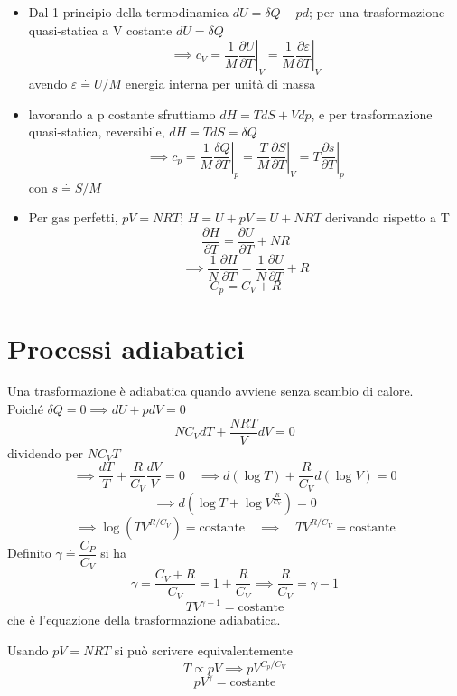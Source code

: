 \documentclass[a4paper,11pt]{report}
\newcommand{\defeq}{\overset{\cdot}{=}}
\begin{document}
		\begin{itemize}
			\item Dal 1 principio della termodinamica $dU = \delta Q - pd$; per una trasformazione quasi-statica a V costante $dU = \delta Q$
			$$
			\implies c_V =  \left.\dfrac{1}{M}\dfrac{\partial U}{\partial T}\right|_{V} =  \left.\dfrac{1}{M}\dfrac{\partial \varepsilon}{\partial T}\right|_{V}
			$$
			avendo $\varepsilon \defeq U/M$ energia interna per unità di massa
			
			\item lavorando a p costante sfruttiamo $dH = TdS  + Vdp$, e per trasformazione quasi-statica, reversibile, $dH = TdS = \delta Q$
			$$
			\implies c_p =  \left.\dfrac{1}{M}\dfrac{\delta Q }{\partial T}\right|_{p} =
			\left.\dfrac{T}{M}\dfrac{\partial S}{\partial T}\right|_{V} = 
			\left. T \dfrac{\partial s}{\partial T}\right|_{p}
			$$
			con $s\defeq S/M$
			
			\item Per gas perfetti, $pV = NRT$; $ H= U+pV = U + NRT$
			derivando rispetto a T
			$$
			\dfrac{\partial H}{\partial T} = \dfrac{\partial U}{\partial T} + NR
			$$
			$$
			\implies \dfrac{1}{N} \dfrac{\partial H}{\partial T} = \dfrac{1}{N}\dfrac{\partial U}{\partial T} + R
			$$
			$$
			C_p = C_V + R
			$$
		\end{itemize}		
	
	\section{Processi adiabatici}
		Una trasformazione è adiabatica quando avviene senza scambio di calore.\\
		Poiché $\delta Q =0 \implies dU + pdV =0$
		$$
		NC_VdT + \dfrac{NRT}{V}dV = 0
		$$
		dividendo per $NC_VT$
		$$
		\implies \dfrac{dT}{T} + \dfrac{R}{C_V} \dfrac{dV}{V}=0 \quad 
		\implies d\left(\log T\right) +  \dfrac{R}{C_V} d(\log V) = 0
		$$
		$$
		\implies d\left(\log T + \log V^{ \frac{R}{C_V}}\right) = 0
		$$
		$$
		\implies \log(TV^{R/C_V}) = \mathrm{costante} 
		\quad \implies \quad TV^{R/C_V} = \textrm{costante}
		$$
		Definito $\gamma \defeq \dfrac{C_P}{C_V}$ si ha
		$$
		\gamma = \dfrac{C_V + R}{C_V} = 1 + \dfrac{R}{C_V} \implies \dfrac{R}{C_V} = \gamma -1
		$$
		\begin{equation}
			TV^{\gamma -1} = \mathrm{costante}
		\end{equation}
		che è l'equazione della trasformazione adiabatica.
		
		Usando $pV = NRT$ si può scrivere equivalentemente
		$$
		T \propto pV \implies pV^{C_p/C_V}
		$$
		\begin{equation}
			pV^{\gamma} = \mathrm{costante}
		\end{equation}
		
\end{document}

